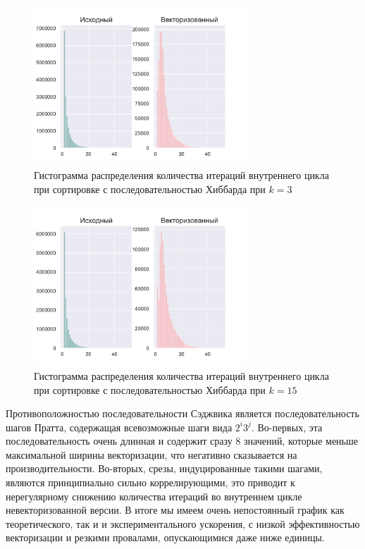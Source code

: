 \documentclass[utf8]{psta}
\begin{document}
\begin{figure}
\includegraphics[width=8cm,height=6cm]{pics/pic_hibbard_k_3}
\caption{Гистограмма распределения количества итераций внутреннего цикла при сортировке с последовательностью Хиббарда при $k = 3$}
\label{pic:hibbard_k_3}
\end{figure}

\begin{figure}
\includegraphics[width=8cm,height=6cm]{pics/pic_hibbard_k_15}
\caption{Гистограмма распределения количества итераций внутреннего цикла при сортировке с последовательностью Хиббарда при $k = 15$}
\label{pic:hibbard_k_15}
\end{figure}

Противоположностью последовательности Сэджвика является последовательность шагов Пратта, содержащая всевозможные шаги вида $2^i3^j$.
Во-первых, эта последовательность очень длинная и содержит сразу 8 значений, которые меньше максимальной ширины векторизации, что негативно сказывается на производительности.
Во-вторых, срезы, индуцированные такими шагами, являются принципиально сильно коррелирующими, это приводит к нерегулярному снижению количества итераций во внутреннем цикле невекторизованной версии.
В итоге мы имеем очень непостоянный график как теоретического, так и и экспериментального ускорения, с низкой эффективностью векторизации и резкими провалами, опускающимися даже ниже единицы.
\end{document}

